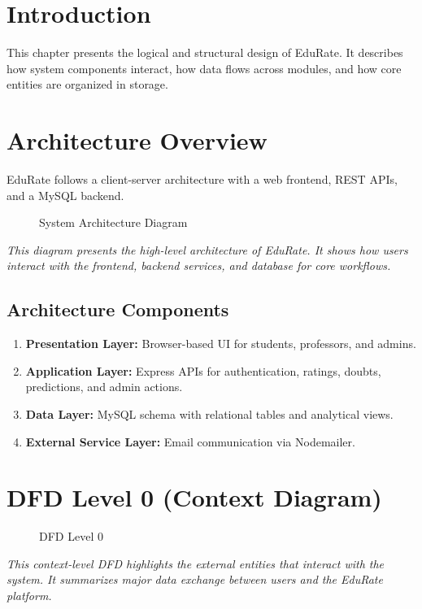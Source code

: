\section{Introduction}
This chapter presents the logical and structural design of EduRate. It describes how system components interact, how data flows across modules, and how core entities are organized in storage.

\section{Architecture Overview}
EduRate follows a client-server architecture with a web frontend, REST APIs, and a MySQL backend.

\begin{figure}[H]
\centering

\caption{System Architecture Diagram}
\end{figure}
\noindent\textit{This diagram presents the high-level architecture of EduRate. It shows how users interact with the frontend, backend services, and database for core workflows.}

\subsection*{Architecture Components}
\begin{enumerate}[label=\Alph*., leftmargin=1.5em]
    \item \textbf{Presentation Layer:} Browser-based UI for students, professors, and admins.
    \item \textbf{Application Layer:} Express APIs for authentication, ratings, doubts, predictions, and admin actions.
    \item \textbf{Data Layer:} MySQL schema with relational tables and analytical views.
    \item \textbf{External Service Layer:} Email communication via Nodemailer.
\end{enumerate}

\section{DFD Level 0 (Context Diagram)}
\begin{figure}[H]
\centering

\caption{DFD Level 0}
\end{figure}
\noindent\textit{This context-level DFD highlights the external entities that interact with the system. It summarizes major data exchange between users and the EduRate platform.}

